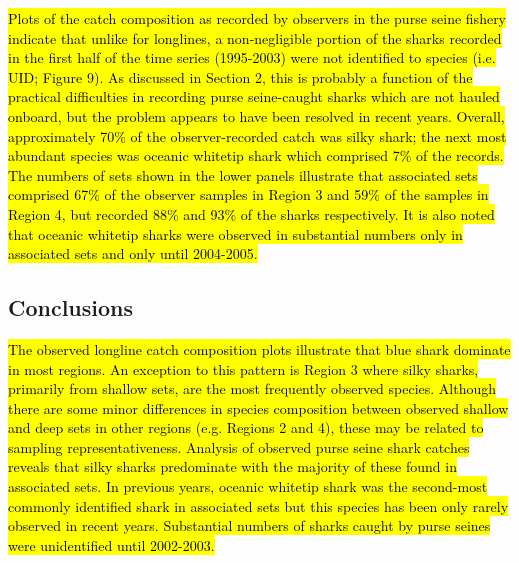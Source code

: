 \documentclass[12pt]{SCreport}
\begin{document}
\hl{ Plots of the catch composition as recorded by observers in the purse seine fishery indicate that unlike for longlines, a non-negligible portion of the sharks recorded in the first half of the time series (1995-2003) were not identified to species (i.e. UID; Figure 9). As discussed in Section 2, this is probably a function of the practical difficulties in recording purse seine-caught sharks which are not hauled onboard, but the problem appears to have been resolved in recent years. Overall, approximately 70\% of the observer-recorded catch was silky shark; the next most abundant species was oceanic whitetip shark which comprised 7\% of the records. The numbers of sets shown in the lower panels illustrate that associated sets comprised 67\% of the observer samples in Region 3 and 59\% of the samples in Region 4, but recorded 88\% and 93\% of the sharks respectively. It is also noted that oceanic whitetip sharks were observed in substantial numbers only in associated sets and only until 2004-2005.}
 


 
 
 \subsection{Conclusions}
 
\hl{ The observed longline catch composition plots illustrate that blue shark dominate in most regions. An exception to this pattern is Region 3 where silky sharks, primarily from shallow sets, are the most frequently observed species. Although there are some minor differences in species composition between observed shallow and deep sets in other regions (e.g. Regions 2 and 4), these may be related to sampling representativeness. Analysis of observed purse seine shark catches reveals that silky sharks predominate with the majority of these found in associated sets. In previous years, oceanic whitetip shark was the second-most commonly identified shark in associated sets but this species has been only rarely observed in recent years. Substantial numbers of sharks caught by purse seines were unidentified until 2002-2003.}
      
\end{document}
